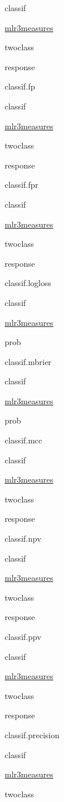 \documentclass[]{article}
\begin{document}
classif

\href{https://cran.r-project.org/package=mlr3measures}{mlr3measures}

twoclass

response

classif.fp

classif

\href{https://cran.r-project.org/package=mlr3measures}{mlr3measures}

twoclass

response

classif.fpr

classif

\href{https://cran.r-project.org/package=mlr3measures}{mlr3measures}

twoclass

response

classif.logloss

classif

\href{https://cran.r-project.org/package=mlr3measures}{mlr3measures}

prob

classif.mbrier

classif

\href{https://cran.r-project.org/package=mlr3measures}{mlr3measures}

prob

classif.mcc

classif

\href{https://cran.r-project.org/package=mlr3measures}{mlr3measures}

twoclass

response

classif.npv

classif

\href{https://cran.r-project.org/package=mlr3measures}{mlr3measures}

twoclass

response

classif.ppv

classif

\href{https://cran.r-project.org/package=mlr3measures}{mlr3measures}

twoclass

response

classif.precision

classif

\href{https://cran.r-project.org/package=mlr3measures}{mlr3measures}

twoclass
\end{document}
